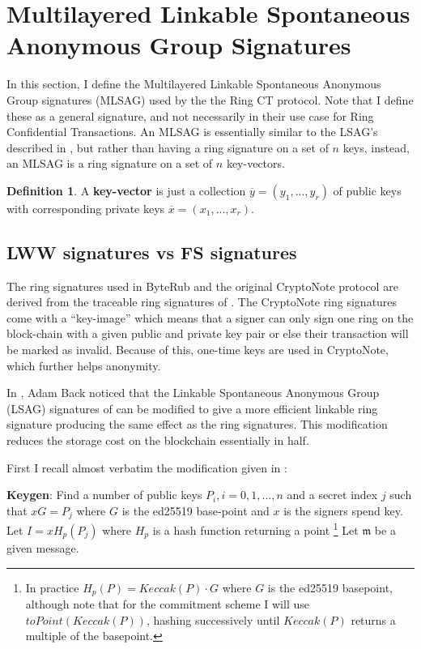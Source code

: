 \documentclass[12pt,english]{mrl}
\theoremstyle{definition}
\newtheorem{Defn}[lem]{Definition}
\newenvironment{defn}{\begin{Defn}\rm}{\end{Defn}}
\numberwithin{equation}{section}
\numberwithin{figure}{section}
\numberwithin{equation}{section}
\numberwithin{equation}{section}
\numberwithin{figure}{section}
\begin{document}
\section{Multilayered Linkable
Spontaneous Anonymous Group Signatures}
\label{MLSAGsection}



In this section, I define the Multilayered Linkable Spontaneous Anonymous 
Group signatures (MLSAG) used by the the Ring CT protocol. Note that
I define these as a general signature, and not necessarily in their
use case for Ring Confidential Transactions. An MLSAG is essentially similar to
the LSAG's described in \cite{LWW}, but rather than having a ring
signature on a set of $n$ keys, instead, an MLSAG is a ring signature
on a set of $n$ key-vectors. 
\begin{defn}
\label{def:A-key-vector-is}A \textbf{key-vector} is just a collection
$\overline{y}=\left(y_{1},...,y_{r}\right)$ of public keys with corresponding
private keys $\overline{x}=\left(x_{1},...,x_{r}\right)$. 
\end{defn}

\subsection{\label{sub:BackLSAG}LWW signatures vs FS signatures}

The ring signatures used in ByteRub and the original CryptoNote protocol are
derived from the traceable ring signatures of \cite{FS}. The CryptoNote \cite{CN}
ring signatures come with a ``key-image'' which means that a signer
can only sign one ring on the block-chain with a given public and
private key pair or else their transaction will be marked as invalid. Because of this, one-time keys are used in CryptoNote,
which further helps anonymity. 

In \cite{B}, Adam Back noticed that the Linkable Spontaneous Anonymous
Group (LSAG) signatures of \cite{LWW} can be modified to give a more efficient
linkable ring signature producing the same effect as the \cite{FS}
ring signatures. This modification reduces the storage cost on the
blockchain essentially in half.

First I recall almost verbatim the modification given in \cite{B}: 

\textbf{Keygen}: Find a number of public keys $P_{i},i=0,1,...,n$
and a secret index $j$ such that $xG=P_{j}$ where $G$ is the ed25519
base-point and $x$ is the signers spend key. Let $I=xH_p\left(P_{j}\right)$
where $H_p$ is a hash function returning a point \footnote{In practice $H_p(P) = Keccak(P)\cdot G$ where $G$ is the ed25519 basepoint, although note that for the commitment scheme I will use $toPoint(Keccak(P))$, hashing successively until $Keccak(P)$ returns a multiple of the basepoint.}
Let $\mathfrak{m}$ be a given message. 
\end{document}
